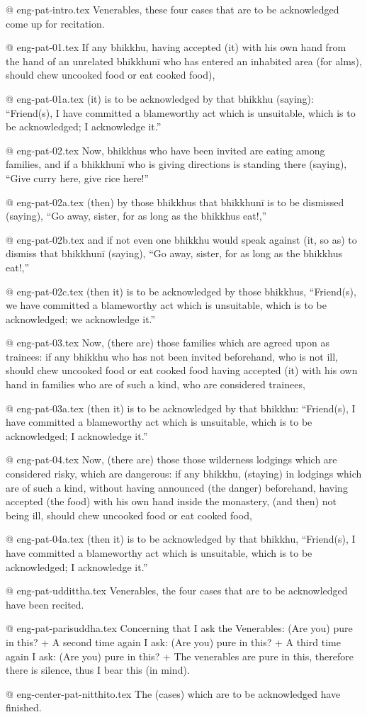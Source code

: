 @ eng-pat-intro.tex
Venerables, these four cases that are to be acknowledged come up for recitation.

@ eng-pat-01.tex
If any bhikkhu, having accepted (it) with his own hand from the hand of an unrelated bhikkhunī who has entered an inhabited area (for alms), should chew uncooked food or eat cooked food),

@ eng-pat-01a.tex
(it) is to be acknowledged by that bhikkhu (saying): “Friend(s), I have committed a blameworthy act which is unsuitable, which is to be acknowledged; I acknowledge it.”

@ eng-pat-02.tex
Now, bhikkhus who have been invited are eating among families, and if a bhikkhunī who is giving directions is standing there (saying), “Give curry here, give rice here!”

@ eng-pat-02a.tex
(then) by those bhikkhus that bhikkhunī is to be dismissed (saying), “Go away, sister, for as long as the bhikkhus eat!,”

@ eng-pat-02b.tex
and if not even one bhikkhu would speak against (it, so as) to dismiss that bhikkhunī (saying), “Go away, sister, for as long as the bhikkhus eat!,”

@ eng-pat-02c.tex
(then it) is to be acknowledged by those bhikkhus, “Friend(s), we have committed a blameworthy act which is unsuitable, which is to be acknowledged; we acknowledge it.”

@ eng-pat-03.tex
Now, (there are) those families which are agreed upon as trainees: if any bhikkhu who has not been invited beforehand, who is not ill, should chew uncooked food or eat cooked food having accepted (it) with his own hand in families who are of such a kind, who are considered trainees,

@ eng-pat-03a.tex
(then it) is to be acknowledged by that bhikkhu: “Friend(s), I have committed a blameworthy act which is unsuitable, which is to be acknowledged; I acknowledge it.”

@ eng-pat-04.tex
Now, (there are) those those wilderness lodgings which are considered risky, which are dangerous: if any bhikkhu, (staying) in lodgings which are of such a kind, without having announced (the danger) beforehand, having accepted (the food) with his own hand inside the monastery, (and then) not being ill, should chew uncooked food or eat cooked food,

@ eng-pat-04a.tex
(then it) is to be acknowledged by that bhikkhu, “Friend(s), I have committed a blameworthy act which is unsuitable, which is to be acknowledged; I acknowledge it.”

@ eng-pat-uddittha.tex
Venerables, the four cases that are to be acknowledged have been recited.

@ eng-pat-parisuddha.tex
Concerning that I ask the Venerables: (Are you) pure in this? +
A second time again I ask: (Are you) pure in this? +
A third time again I ask: (Are you) pure in this? +
The venerables are pure in this, therefore there is silence, thus I bear this (in mind).

@ eng-center-pat-nitthito.tex
The (cases) which are to be acknowledged have finished.
